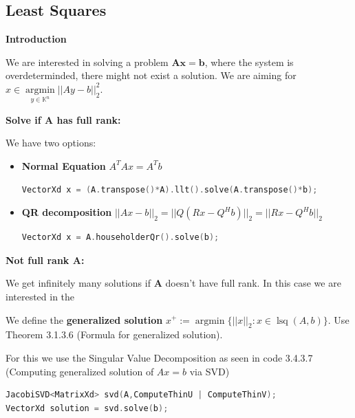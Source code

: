 \documentclass{sciposter}
\renewcommand{\vec}[1]{\mathbf{#1}}
\newcommand{\psection}[1]{\par \textbf{\large#1}}
\begin{document}
\begin{multicols}{2}
 
 
\vfill\null
\columnbreak

\section*{Least Squares}

\psection{Introduction}

We are interested in solving a problem $\vec{A} \vec{x} = \vec{b}$, where the system is overdeterminded, there might not exist a solution. We are aiming for $x \in \operatorname{argmin}\limits_{y\in \mathbb{K}^n} ||Ay - b||_2 ^2$.


\psection{Solve if $\vec{A}$ has full rank:}

We have two options:

\begin{itemize}
	\item \textbf{Normal Equation} $A^T Ax = A^T b$
	\begin{lstlisting}[language=c++]
	VectorXd x = (A.transpose()*A).llt().solve(A.transpose()*b);
	\end{lstlisting}
	\item \textbf{QR decomposition} $||Ax-b||_2 = ||Q(Rx - Q^H b)||_2 = ||Rx - Q^H b||_2$
	\begin{lstlisting}[language=c++]
	VectorXd x = A.householderQr().solve(b);
	\end{lstlisting}
\end{itemize}



\psection{Not full rank $\vec{A}$:}

We get infinitely many solutions if $\vec{A}$ doesn't have full rank. In this case we are interested in the 

\begin{mdframed}
	We define the \textbf{generalized solution} $x^+ := \operatorname{argmin}\{ ||x||_2 : x\in \operatorname{lsq}(A,b)\}$. Use Theorem 3.1.3.6 (Formula for generalized solution).
\end{mdframed}

For this we use the Singular Value Decomposition as seen in code 3.4.3.7 (Computing generalized solution of $Ax=b$ via SVD)


\begin{lstlisting}[language=c++]
JacobiSVD<MatrixXd> svd(A,ComputeThinU | ComputeThinV);
VectorXd solution = svd.solve(b);
\end{lstlisting}


\end{multicols}
\end{document}
